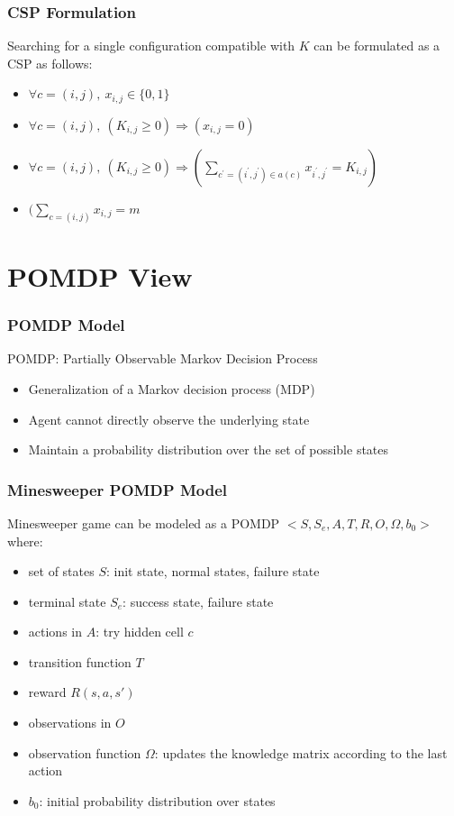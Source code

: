 \documentclass[aspectratio=169]{beamer}
\begin{document}
\begin{frame}
	\frametitle{CSP Formulation}
	Searching for a single configuration compatible with $K$ can be formulated as a CSP as follows:

	\begin{itemize}
		\item ${\forall}c=(i,j),\ x_{i,j} \in \{0,1\} $
		\item ${\forall}c=(i,j),\ (K_{i,j} \geq 0) \Rightarrow (x_{i,j}=0)$
		\item ${\forall}c=(i,j),\ (K_{i,j} \geq 0) \Rightarrow (\sum_{c^{\prime}=(i^{\prime},j^{\prime}) \in a(c)} x_{i^{\prime},j^{\prime}} = K_{i,j})$
		\item $(\sum_{c=(i,j)} x_{i,j} = m$
	\end{itemize}
\end{frame}


\section{POMDP View}

\begin{frame}
	\frametitle{POMDP Model}
	POMDP: Partially Observable Markov Decision Process
	\begin{itemize}
	    \item Generalization of a Markov decision process (MDP)
	    \item Agent cannot directly observe the underlying state
	    \item Maintain a probability distribution over the set of possible states
	\end{itemize}
\end{frame}

\begin{frame}
	\frametitle{Minesweeper POMDP Model}
	Minesweeper game can be modeled as a POMDP $<S, S_e, A, T, R, O, \Omega, b_0>$ where:

	\begin{itemize}
		\item set of states $S$: init state, normal states, failure state
		\item terminal state $S_e$: success state, failure state
		\item actions in $A$: try hidden cell $c$
		\item transition function $T$
		\item reward $R(s, a, s')$
		\item observations in $O$
		\item observation function $\Omega$: updates the knowledge matrix according to the last action
		\item $b_0$: initial probability distribution over states
	\end{itemize}
\end{frame}
\end{document}

